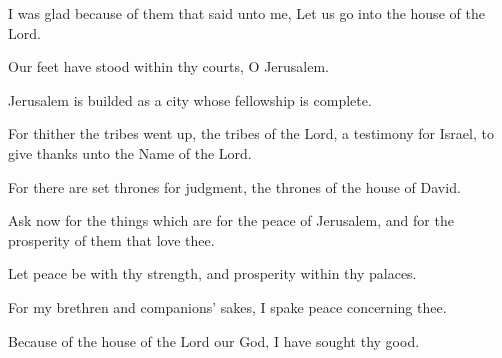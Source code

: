 I was glad because of them that said unto me, Let us go into the house of the Lord.

Our feet have stood within thy courts, O Jerusalem.

Jerusalem is builded as a city whose fellowship is complete.

For thither the tribes went up, the tribes of the Lord, a testimony for Israel, to give thanks unto the Name of the Lord.

For there are set thrones for judgment, the thrones of the house of David.

Ask now for the things which are for the peace of Jerusalem, and for the prosperity of them that love thee.

Let peace be with thy strength, and prosperity within thy palaces.

For my brethren and companions’ sakes, I spake peace concerning thee.

Because of the house of the Lord our God, I have sought thy good.
